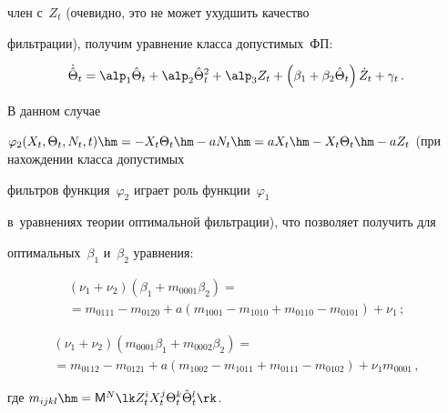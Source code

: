член с~$Z_t$ (очевидно, это не может ухудшить качество


фильтрации), получим уравнение класса допустимых~ФП:


 \begin{equation*}


 \dot{\hat\Theta}_t =\alp_1 \hat\Theta_t +\alp_2 \hat\Theta_t^2 +


 \alp_3 Z_t +\left(\beta_1 +\beta_2 \hat\Theta_t \right)


 \dot Z_t +\gamma_t\,.




 \end{equation*}





В данном случае


$\varphi_2 (X_t,\Theta_t, N_t,t)\hm=-X_t\Theta_t\hm- aN_t


\hm=aX_t\hm-X_t\Theta_t\hm -aZ_t$ (при нахождении класса допустимых


фильтров функция~$\varphi_2$ играет роль функции~$\varphi_1$ 


в~уравнениях теории оптимальной фильтрации), что позволяет получить для


оптимальных~$\beta_1$ и~$\beta_2$ уравнения:


 \begin{multline*}


 \left(\nu_1+\nu_2\right)\left(\beta_1 +m_{0001}\beta_2\right) ={}\\


{}=m_{0111} -m_{0120}+a(m_{1001}-m_{1010} +m_{0110}-m_{0101})+\nu_1\,;


\end{multline*}








\noindent


\begin{multline*}


\left(\nu_1+\nu_2\right)\left(m_{0001}\beta_1 +m_{0002}\beta_2\right) ={}\\


{}=m_{0112}-m_{0121}+a(m_{1002}-m_{1011}+m_{0111}-m_{0102})+\nu_1 m_{0001}\,,




\end{multline*}


где  $m_{ijkl}\hm={\sf M}^N \lk Z_t^i X_t^j \Theta_t^k \hat\Theta_t^l\rk$.


